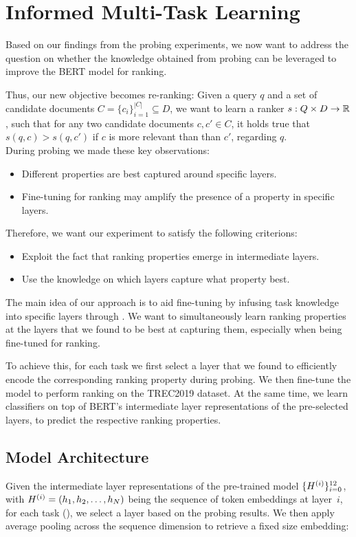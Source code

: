 \chapter{Informed Multi-Task Learning}
\label{chap:mtl}
Based on our findings from the probing experiments, we now want to address the question on whether the knowledge obtained from probing can be leveraged to improve the BERT model for ranking.

Thus, our new objective becomes re-ranking: Given a query $q$ and a set of candidate documents $C=\{c_i\}_{i=1}^{|C|} \subseteq D$, we want to learn a ranker $s: Q \times D \rightarrow \mathbb{R}$, such that for any two candidate documents $c, c' \in C$, it holds true that $s(q, c) > s(q, c')$ if $c$ is more relevant than than $c'$, regarding $q$.\\
During probing we made these key observations:

\begin{itemize}
    \item Different properties are best captured around specific layers.
    \item Fine-tuning for ranking may amplify the presence of a property in specific layers.
\end{itemize}
Therefore, we want our experiment to satisfy the following criterions:

\begin{itemize}
    \item Exploit the fact that ranking properties emerge in intermediate layers.
    \item Use the knowledge on which layers capture what property best.
\end{itemize}
The main idea of our approach is to aid fine-tuning by infusing task knowledge into specific layers through . We want to simultaneously learn ranking properties at the layers that we found to be best at capturing them, especially when being fine-tuned for ranking.

To achieve this, for each task we first select a layer that we found to efficiently encode the corresponding  ranking property during probing. We then fine-tune the  model to perform ranking on the TREC2019 dataset. At the same time, we learn classifiers on top of BERT's intermediate layer representations of the pre-selected layers, to predict the respective ranking properties.

\section{Model Architecture}
Given the intermediate layer representations of the pre-trained  model $\{H^{(i)}\}_{i=0}^{12}$, with $H^{(i)} = (h_1, h_2, \dots, h_{N})$ being the sequence of token embeddings at layer~$i$, for each task (), we select a layer based on the probing results. We then apply average pooling across the sequence dimension to retrieve a fixed size embedding:

